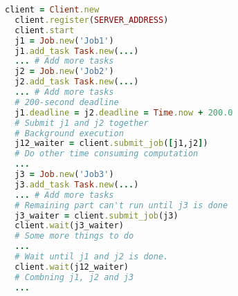 \begin{lstlisting}[language=Ruby]
  client = Client.new
  client.register(SERVER_ADDRESS)
  client.start
  j1 = Job.new('Job1')
  j1.add_task Task.new(...)
  ... # Add more tasks
  j2 = Job.new('Job2')
  j2.add_task Task.new(...)
  ... # Add more tasks
  # 200-second deadline
  j1.deadline = j2.deadline = Time.now + 200.0
  # Submit j1 and j2 together
  # Background execution
  j12_waiter = client.submit_job([j1,j2])
  # Do other time consuming computation
  ...
  j3 = Job.new('Job3')
  j3.add_task Task.new(...)
  ... # Add more tasks
  # Remaining part can't run until j3 is done
  j3_waiter = client.submit_job(j3)
  client.wait(j3_waiter)
  # Some more things to do
  ...
  # Wait until j1 and j2 is done.
  client.wait(j12_waiter)
  # Combning j1, j2 and j3
  ...
\end{lstlisting}
